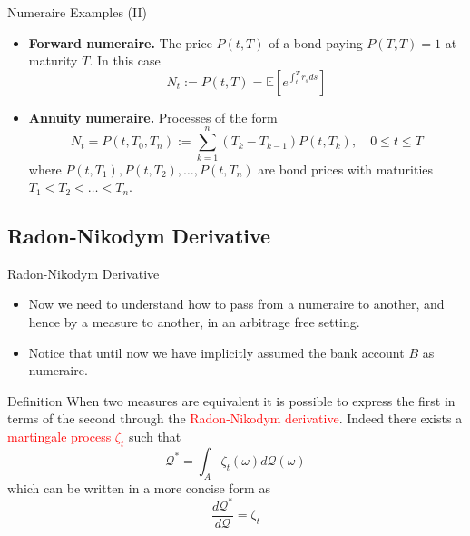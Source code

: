 \documentclass{beamer}
\begin{document}
\begin{frame}{Numeraire Examples (II)}
  \begin{itemize}
  \item<3-> \textbf{Forward numeraire.} The price $P(t,T)$ of a bond paying $P(T,T)=1$ at maturity $T$. In this case
    \begin{equation*}
      N_t := P(t,T)=\mathbb{E}\left[e^{\int_t^T r_s ds}\right]
    \end{equation*}
  \item<4-> \textbf{Annuity numeraire.} Processes of the form
    \begin{equation*}
      N_t = P(t, T_0, T_n) := \sum_{k=1}^{n}(T_k - T_{k-1})P(t, T_k), \quad 0 \le t \le T
    \end{equation*}
    where $P(t,T_1),P(t,T_2),\ldots,P(t,T_n)$ are bond prices with maturities $T_1 < T_2 < \ldots < T_n$.
  \end{itemize}
\end{frame}

\subsection{Radon-Nikodym Derivative}
\begin{frame}{Radon-Nikodym Derivative}
  \begin{itemize}
  \item Now we need to understand how to pass from a numeraire to another, and hence by a measure to another, in an arbitrage free setting.
  \item Notice that until now we have implicitly assumed the bank account $B$ as numeraire.
  \end{itemize}
	\pause
  \begin{block}{Definition}
    When two measures are equivalent it is possible to express the first in terms of the second through the \textcolor{red}{Radon-Nikodym derivative}. Indeed there exists a \textcolor{red}{martingale process $\zeta_t$} such that
    \begin{equation*}
      \mathcal{Q}^* =\int_{A} \zeta_t(\omega)d\mathcal{Q}(\omega)
    \end{equation*}
    which can be written in a more concise form as
    \begin{equation}
      \frac{d\mathcal{Q}^*}{d\mathcal{Q}} = \zeta_t
      \label{eq:radon_nikodym_der}
    \end{equation}
  \end{block}
\end{frame}
\end{document}
